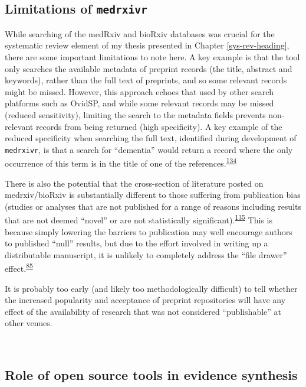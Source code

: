 \documentclass[a4paper, twoside]{templates/ociamthesis}
\begin{document}
\hypertarget{medrxivr-limitations}{%
\subsection{\texorpdfstring{Limitations of \texttt{medrxivr}}{Limitations of medrxivr}}\label{medrxivr-limitations}}

While searching of the medRxiv and bioRxiv databases was crucial for the systematic review element of my thesis presented in Chapter \ref{sys-rev-heading}, there are some important limitations to note here. A key example is that the tool only searches the available metadata of preprint records (the title, abstract and keywords), rather than the full text of preprints, and so some relevant records might be missed. However, this approach echoes that used by other search platforms such as OvidSP, and while some relevant records may be missed (reduced sensitivity), limiting the search to the metadata fields prevents non-relevant records from being returned (high specificity). A key example of the reduced specificity when searching the full text, identified during development of \texttt{medrxivr}, is that a search for ``dementia'' would return a record where the only occurrence of this term is in the title of one of the references.\textsuperscript{\protect\hyperlink{ref-bong2019}{134}}

There is also the potential that the cross-section of literature posted on medrxiv/bioRxiv is substantially different to those suffering from publication bias (studies or analyses that are not published for a range of reasons including results that are not deemed ``novel'' or are not statistically significant).\textsuperscript{\protect\hyperlink{ref-song2010}{135}} This is because simply lowering the barriers to publication may well encourage authors to published ``null'' results, but due to the effort involved in writing up a distributable manuscript, it is unlikely to completely address the ``file drawer'' effect.\textsuperscript{\protect\hyperlink{ref-rosenthal1979}{85}}

It is probably too early (and likely too methodologically difficult) to tell whether the increased popularity and acceptance of preprint repositories will have any effect of the availability of research that was not considered ``publishable'' at other venues.

~

\hypertarget{role-of-open-source-tools-in-evidence-synthesis}{%
\subsection{Role of open source tools in evidence synthesis}\label{role-of-open-source-tools-in-evidence-synthesis}}
\end{document}
